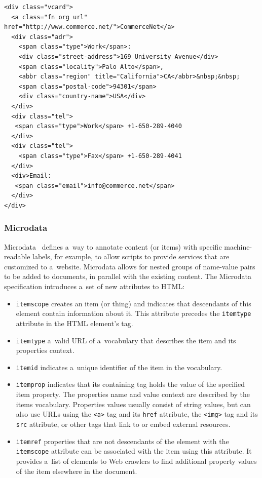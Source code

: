 \begin{lstlisting}[caption={
   [Sample code snippet with embedded hCard Microformat mark-up]
   {Sample code snippet with embedded \texttt{hCard} Microformat
    mark-up (\url{http://microformats.org/wiki/hcard})}
  },
  label={code:microformats}]
<div class="vcard">
  <a class="fn org url" href="http://www.commerce.net/">CommerceNet</a>
  <div class="adr">
    <span class="type">Work</span>:
    <div class="street-address">169 University Avenue</div>
    <span class="locality">Palo Alto</span>,
    <abbr class="region" title="California">CA</abbr>&nbsp;&nbsp;
    <span class="postal-code">94301</span>
    <div class="country-name">USA</div>
  </div>
  <div class="tel">
   <span class="type">Work</span> +1-650-289-4040
  </div>
  <div class="tel">
    <span class="type">Fax</span> +1-650-289-4041
  </div>
  <div>Email:
   <span class="email">info@commerce.net</span>
  </div>
</div>
\end{lstlisting}

\subsubsection{Microdata}

Microdata~\cite{hickson2012microdata} defines a~way to annotate
content (or items) with specific machine-readable labels,
for example, to allow scripts to provide services that are
customized to a~website.
Microdata allows for nested groups of name-value pairs
to be added to documents,
in parallel with the existing content.
The Microdata specification introduces
a~set of new attributes to HTML:

\begin{itemize}
  \item \texttt{itemscope} creates an item (or thing) and
        indicates that descendants of this element contain
        information about it. This attribute precedes the
        \texttt{itemtype} attribute in the HTML element's tag.
  \item \texttt{itemtype} a~valid URL of a~vocabulary that
        describes the item and its properties context.
  \item \texttt{itemid} indicates a~unique identifier
        of the item in the vocabulary.
  \item \texttt{itemprop} indicates that its containing tag
        holds the value of the specified item property.
        The properties name and value context are described by
        the items vocabulary. Properties values usually
        consist of string values,
        but can also use URLs using the \texttt{<a>} tag
        and its \texttt{href} attribute,
        the \texttt{<img>} tag and its \texttt{src} attribute,
        or other tags that link to or embed external resources.
  \item \texttt{itemref} properties that are not descendants of
        the element with the \texttt{itemscope} attribute
        can be associated with the item using this attribute.
        It provides a~list of elements to Web crawlers to find
        additional property values of the item
        elsewhere in the document.
\end{itemize}

